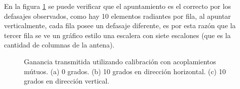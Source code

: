 En la figura \ref{fig:nonErrorMutual} se puede verificar que el apuntamiento es el correcto por los defasajes observados, como 
hay 10 elementos radiantes por fila, al apuntar verticalmente, cada fila posee un defasaje diferente, es por esta razón que la
tercer fila se ve un gráfico estilo una escalera con siete escalones (que es la cantidad de columnas de la antena). 
\begin{figure}[H]
	\centering
 	
		\caption{Ganancia transmitida utilizando calibración con acoplamientos mútuos. (a) 0 grados. (b) 10 grados en 
		dirección horizontal. (c) 10 grados en dirección vertical.}
	\label{fig:nonErrorMutual}
\end{figure}
